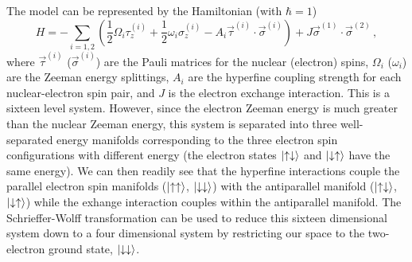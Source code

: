 The model can be represented by the Hamiltonian (with $\hbar=1$)
\begin{equation}
    H = -\sum_{i=1,2} \left(\frac{1}{2}\Omega_i \tau_{z}^{(i)} + \frac{1}{2}\omega_i \sigma_z^{(i)} - A_i \vec{\tau}^{(i)}\cdot \vec{\sigma}^{(i)}\right) + J\vec{\sigma}^{(1)}\cdot\vec{\sigma}^{(2)} \,,
\end{equation}
where $\vec{\tau}^{(i)}$ ($\vec{\sigma}^{(i)}$) are the Pauli matrices for the nuclear (electron) spins, $\Omega_i$ ($\omega_{i}$) are the Zeeman energy splittings, $A_i$ are the hyperfine coupling strength for each nuclear-electron spin pair, and $J$ is the electron exchange interaction.
This is a sixteen level system.
However, since the electron Zeeman energy is much greater than the nuclear Zeeman energy, this system is separated into three well-separated energy manifolds corresponding to the three electron spin configurations with different energy (the electron states $\ket{\uparrow\downarrow}$ and $\ket{\downarrow\uparrow}$ have the same energy).
We can then readily see that the hyperfine interactions couple the parallel electron spin manifolds ($\ket{\uparrow\uparrow}$, $\ket{\downarrow\downarrow}$) with the antiparallel manifold ($\ket{\uparrow\downarrow}$, $\ket{\downarrow\uparrow}$) while the exhange interaction couples within the antiparallel manifold.
The Schrieffer-Wolff transformation can be used to reduce this sixteen dimensional system down to a four dimensional system by restricting our space to the two-electron ground state, $\ket{\downarrow\downarrow}$.

